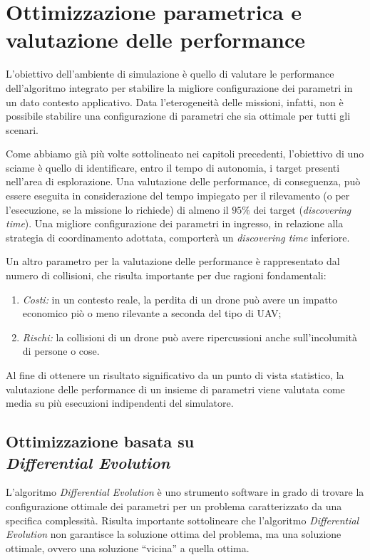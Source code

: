 \chapter{Ottimizzazione parametrica e valutazione delle performance}

L'obiettivo dell'ambiente di simulazione è quello di valutare le performance dell'algoritmo integrato per stabilire la migliore configurazione dei parametri in un dato contesto applicativo.
Data l'eterogeneità delle missioni, infatti, non è possibile stabilire una configurazione di parametri che sia ottimale per tutti gli scenari.

Come abbiamo già più volte sottolineato nei capitoli precedenti, l'obiettivo di uno sciame è quello di identificare, entro il tempo di autonomia, i target presenti nell'area di esplorazione.
Una valutazione delle performance, di conseguenza, può essere eseguita in considerazione del tempo impiegato per il rilevamento (o per l'esecuzione, se la missione lo richiede) di almeno il $95\%$ dei target (\textit{discovering time}).
Una migliore configurazione dei parametri in ingresso, in relazione alla strategia di coordinamento adottata, comporterà un \textit{discovering time} inferiore.

Un altro parametro per la valutazione delle performance è rappresentato dal numero di collisioni, che risulta importante per due ragioni fondamentali:
\begin{enumerate}
    \item \textit{Costi:} in un contesto reale, la perdita di un drone può avere un impatto economico piò o meno rilevante a seconda del tipo di UAV;
    \item \textit{Rischi:} la collisioni di un drone può avere ripercussioni anche sull'incolumità di persone o cose.
\end{enumerate}

Al fine di ottenere un risultato significativo da un punto di vista statistico, la valutazione delle performance di un insieme di parametri viene  valutata come media su più esecuzioni indipendenti del simulatore.

\section{Ottimizzazione basata su \\\textit{Differential Evolution}} \label{sezione_de}

L’algoritmo \textit{Differential Evolution} è uno strumento software in grado di trovare la configurazione ottimale dei parametri per un problema caratterizzato da una specifica complessità. 
Risulta importante sottolineare che l’algoritmo \textit{Differential Evolution} non garantisce la soluzione ottima del problema, ma una soluzione ottimale, ovvero una soluzione “vicina” a quella ottima. 

